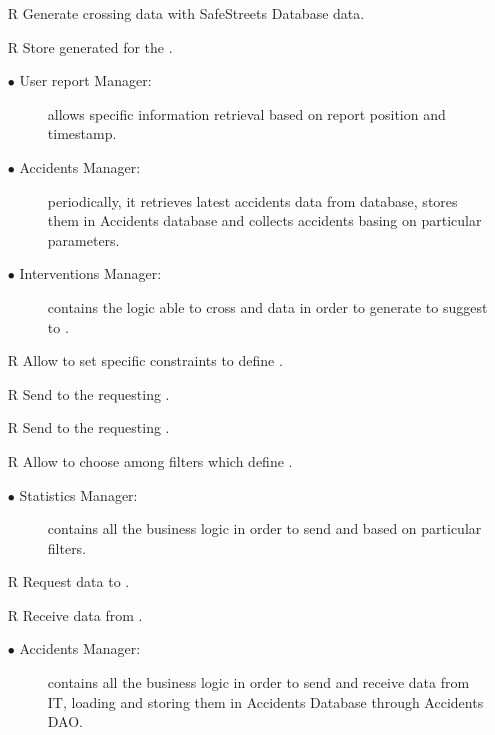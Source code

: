 \documentclass[../DD.tex]{subfiles}
\begin{document}
\begin{itemize}
	\item[R\subs{16}]Generate  crossing   data with SafeStreets Database data.
	\item[R\subs{17}]Store generated  for the .
	\begin{description}
	\item[$\bullet$ User report Manager:] allows specific  information retrieval based on report position and timestamp.
	\item[$\bullet$ Accidents Manager:] periodically, it retrieves latest accidents data from  database, stores them in Accidents database and collects accidents basing on particular parameters.
	\item[$\bullet$ Interventions Manager:] contains the logic able to cross  and  data in order to generate  to suggest to .
	\end{description}
	
	\item[R\subs{18}]Allow  to set specific constraints to define .
	\item[R\subs{19}]Send  to the requesting .
	\item[R\subs{24}]Send  to the requesting .
	\item[R\subs{23}]Allow  to choose among filters which define .
	\begin{description}
	\item[$\bullet$ Statistics Manager:] contains all the business logic in order to send  and   based on particular filters.
	\end{description}
	
	\item[R\subs{27}]Request  data to .
	\item[R\subs{28}]Receive  data from .
		\begin{description}
		\item[$\bullet$ Accidents Manager:] contains all the business logic in order to send and receive  data from  IT, loading and storing them in Accidents Database through Accidents DAO.
	\end{description}

\end{itemize}
\end{document}
